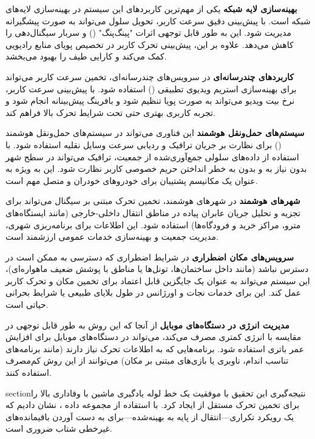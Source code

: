 \documentclass{CSICC}
\begin{document}
\textbf{بهینه‌سازی لایه شبکه}  
یکی از مهم‌ترین کاربردهای این سیستم در بهینه‌سازی لایه‌های شبکه است. با پیش‌بینی دقیق سرعت کاربر، تحویل سلول می‌تواند به صورت پیشگیرانه مدیریت شود. این به طور قابل توجهی اثرات "پینگ‌پنگ" () و سربار سیگنال‌دهی را کاهش می‌دهد. علاوه بر این، پیش‌بینی تحرک کاربر در تخصیص پویای منابع رادیویی کمک می‌کند و کارایی طیف را بهبود می‌بخشد.

\textbf{کاربردهای چندرسانه‌ای}  
در سرویس‌های چندرسانه‌ای، تخمین سرعت کاربر می‌تواند برای بهینه‌سازی استریم ویدیوی تطبیقی () استفاده شود. با پیش‌بینی سرعت کاربر، نرخ بیت ویدیو می‌تواند به صورت پویا تنظیم شود و بافرینگ پیش‌بینانه انجام شود و تجربه کاربری بهتری حتی تحت شرایط تحرک بالا فراهم کند.

\textbf{سیستم‌های حمل‌ونقل هوشمند}  
این فناوری می‌تواند در سیستم‌های حمل‌ونقل هوشمند () برای نظارت بر جریان ترافیک و ردیابی سرعت وسایل نقلیه استفاده شود. با استفاده از داده‌های سلولی جمع‌آوری‌شده از جمعیت، ترافیک می‌تواند در سطح شهر بدون نیاز به  و بدون به خطر انداختن حریم خصوصی کاربر نظارت شود. این به ویژه به عنوان یک مکانیسم پشتیبان برای خودروهای خودران و متصل مهم است.

\textbf{شهرهای هوشمند}  
در شهرهای هوشمند، تخمین تحرک مبتنی بر سیگنال می‌تواند برای تجزیه و تحلیل جریان عابران پیاده در مناطق انتقال داخلی-خارجی (مانند ایستگاه‌های مترو، مراکز خرید و فرودگاه‌ها) استفاده شود. این اطلاعات برای برنامه‌ریزی شهری، مدیریت جمعیت و بهینه‌سازی خدمات عمومی ارزشمند است.

\textbf{سرویس‌های مکان اضطراری}  
در شرایط اضطراری که دسترسی به  ممکن است در دسترس نباشد (مانند داخل ساختمان‌ها، تونل‌ها یا مناطق با پوشش ضعیف ماهواره‌ای)، این سیستم می‌تواند به عنوان یک جایگزین قابل اعتماد برای تخمین مکان و تحرک کاربر عمل کند. این برای خدمات نجات و اورژانس در طول بلایای طبیعی یا شرایط بحرانی حیاتی است.

\textbf{مدیریت انرژی در دستگاه‌های موبایل}  
از آنجا که این روش به طور قابل توجهی در مقایسه با  انرژی کمتری مصرف می‌کند، می‌تواند در دستگاه‌های موبایل برای افزایش عمر باتری استفاده شود. برنامه‌هایی که به اطلاعات تحرک نیاز دارند (مانند برنامه‌های تناسب اندام، ناوبری یا بازی‌های مبتنی بر مکان) می‌توانند از این روش کم‌مصرف استفاده کنند.


section{نتیجه‌گیری}
این تحقیق با موفقیت یک خط لوله یادگیری ماشین با وفاداری بالا را برای تخمین تحرک مستقل از  ایجاد کرد. با استفاده از مجموعه داده ، نشان دادیم که یک رویکرد تکراری—انتقال از  پایه به  بهینه‌شده—برای به دست آوردن باقیمانده‌های غیرخطی شتاب ضروری است.
\end{document}
